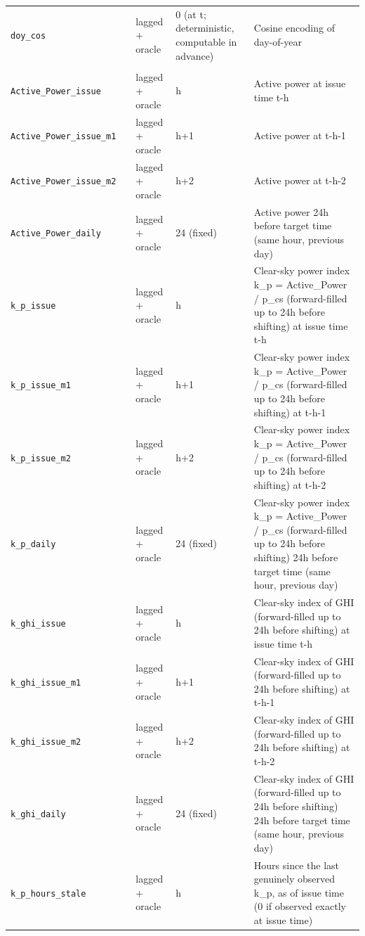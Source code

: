 \begin{table}[t]
\begin{tabular}{llll p{6.5cm}}
    \texttt{doy\_cos} &  & lagged + oracle & 0 (at t; deterministic, computable in advance) & Cosine encoding of day-of-year \\
    \addlinespace
    \multicolumn{5}{l}{\textit{lagged observations (19 features)}} \\
    \texttt{Active\_Power\_issue} &  & lagged + oracle & h & Active power at issue time t-h \\
    \texttt{Active\_Power\_issue\_m1} &  & lagged + oracle & h+1 & Active power at t-h-1 \\
    \texttt{Active\_Power\_issue\_m2} &  & lagged + oracle & h+2 & Active power at t-h-2 \\
    \texttt{Active\_Power\_daily} &  & lagged + oracle & 24 (fixed) & Active power 24h before target time (same hour, previous day) \\
    \texttt{k\_p\_issue} &  & lagged + oracle & h & Clear-sky power index k\_p = Active\_Power / p\_cs (forward-filled up to 24h before shifting) at issue time t-h \\
    \texttt{k\_p\_issue\_m1} &  & lagged + oracle & h+1 & Clear-sky power index k\_p = Active\_Power / p\_cs (forward-filled up to 24h before shifting) at t-h-1 \\
    \texttt{k\_p\_issue\_m2} &  & lagged + oracle & h+2 & Clear-sky power index k\_p = Active\_Power / p\_cs (forward-filled up to 24h before shifting) at t-h-2 \\
    \texttt{k\_p\_daily} &  & lagged + oracle & 24 (fixed) & Clear-sky power index k\_p = Active\_Power / p\_cs (forward-filled up to 24h before shifting) 24h before target time (same hour, previous day) \\
    \texttt{k\_ghi\_issue} &  & lagged + oracle & h & Clear-sky index of GHI (forward-filled up to 24h before shifting) at issue time t-h \\
    \texttt{k\_ghi\_issue\_m1} &  & lagged + oracle & h+1 & Clear-sky index of GHI (forward-filled up to 24h before shifting) at t-h-1 \\
    \texttt{k\_ghi\_issue\_m2} &  & lagged + oracle & h+2 & Clear-sky index of GHI (forward-filled up to 24h before shifting) at t-h-2 \\
    \texttt{k\_ghi\_daily} &  & lagged + oracle & 24 (fixed) & Clear-sky index of GHI (forward-filled up to 24h before shifting) 24h before target time (same hour, previous day) \\
    \texttt{k\_p\_hours\_stale} &  & lagged + oracle & h & Hours since the last genuinely observed k\_p, as of issue time (0 if observed exactly at issue time) \\

\end{tabular}
\end{table}
